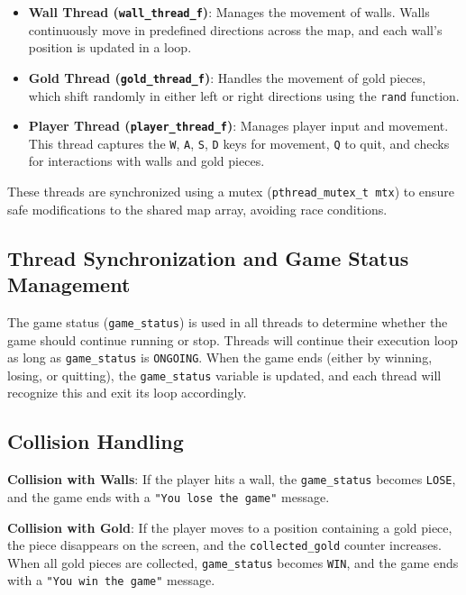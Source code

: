 \documentclass{article}
\begin{document}
\begin{itemize}
    \item \textbf{Wall Thread (\texttt{wall\_thread\_f})}: Manages the movement of walls. Walls continuously move in predefined directions across the map, and each wall's position is updated in a loop.
    
    \item \textbf{Gold Thread (\texttt{gold\_thread\_f})}: Handles the movement of gold pieces, which shift randomly in either left or right directions using the \texttt{rand} function.
    
    \item \textbf{Player Thread (\texttt{player\_thread\_f})}: Manages player input and movement. This thread captures the \texttt{W}, \texttt{A}, \texttt{S}, \texttt{D} keys for movement, \texttt{Q} to quit, and checks for interactions with walls and gold pieces.
\end{itemize}

These threads are synchronized using a mutex (\texttt{pthread\_mutex\_t mtx}) to ensure safe modifications to the shared map array, avoiding race conditions.

\subsection{Thread Synchronization and Game Status Management}
The game status (\texttt{game\_status}) is used in all threads to determine whether the game should continue running or stop. Threads will continue their execution loop as long as \texttt{game\_status} is \texttt{ONGOING}. When the game ends (either by winning, losing, or quitting), the \texttt{game\_status} variable is updated, and each thread will recognize this and exit its loop accordingly.

\subsection{Collision Handling}
\textbf{Collision with Walls}: If the player hits a wall, the \texttt{game\_status} becomes \texttt{LOSE}, and the game ends with a \texttt{"You lose the game"} message.

\textbf{Collision with Gold}: If the player moves to a position containing a gold piece, the piece disappears on the screen, and the \texttt{collected\_gold} counter increases. When all gold pieces are collected, \texttt{game\_status} becomes \texttt{WIN}, and the game ends with a \texttt{"You win the game"} message.
\end{document}
